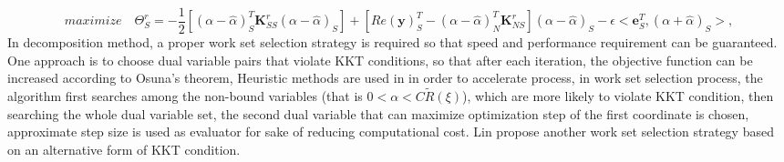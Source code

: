 \documentclass[12pt, draftclsnofoot, onecolumn]{IEEEtran}
\begin{document}
\begin{spacing}{2}
\begin{equation}
maximize\quad \Theta_{S}^{r}=-\frac{1}{2}[(\alpha-\hat{\alpha})_{S}^{T}\mathbf{K}_{SS}^{r}(\alpha-\hat{\alpha})_{S}]+[Re(\mathbf{y})_{S}^{T}-(\alpha-\hat{\alpha})_{N}^{T}\mathbf{K}_{NS}^{r}
](\alpha-\hat{\alpha})_{S}-\epsilon<\mathbf{e}_{S}^{T}, (\alpha+\hat{\alpha})_{S}>,
\label{subset optimization}
\end{equation}
In decomposition method, a proper work set selection strategy is required so that speed and performance requirement can be guaranteed. One approach is to choose dual variable pairs that violate KKT conditions, so that after each iteration, the objective function can be increased according to Osuna's theorem\cite{osuna1997improved}, Heuristic methods are used in in order to accelerate process, in work set selection process, the algorithm first searches among the non-bound variables (that is $0<\alpha<C\tilde{R}(\xi)$), which are more likely to violate KKT condition, then searching the whole dual variable set, the second dual variable that can maximize optimization step of the first coordinate is chosen, approximate step size is used as evaluator for sake of reducing computational cost. Lin propose another work set selection strategy based on an alternative form of KKT condition.


\end{spacing}
\end{document}
